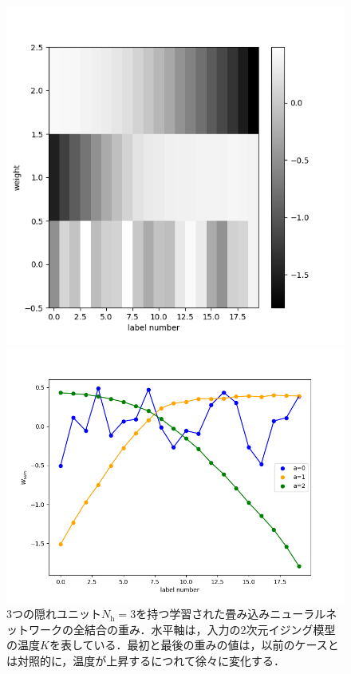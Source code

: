 \documentclass[a4paper,11pt]{jsreport}
\begin{document}
\begin{figure}[H]
  \begin{minipage}[b]{0.45\linewidth}
    \begin{center}
      \includegraphics[keepaspectratio, scale=0.4]{image/温度測定器2_L16_CNN_Nh3_pram.png}
    \end{center}
  \end{minipage}
  \begin{minipage}[b]{0.45\linewidth}
    \begin{center}
      \includegraphics[keepaspectratio, scale=0.4]{image/温度測定器2_L16_CNN_Nh3_weight_plot.png}
    \end{center}
  \end{minipage}
  \caption{3つの隠れユニット$N_{\text{h}}=3$を持つ学習された畳み込みニューラルネットワークの全結合の重み．水平軸は，入力の2次元イジング模型の温度$K$を表している．最初と最後の重みの値は，以前のケースとは対照的に，温度が上昇するにつれて徐々に変化する．}
  \label{温度測定器CNN2重みプロット}
\end{figure}
\end{document}
